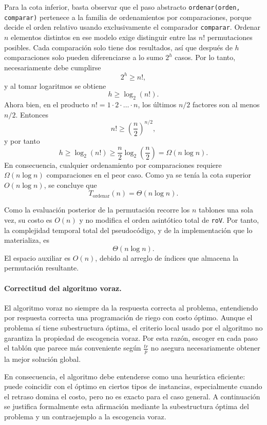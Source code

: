 \documentclass[12pt,a4paper]{article}
\begin{document}
Para la cota inferior, basta observar que el paso abstracto \texttt{ordenar(orden, comparar)} pertenece a la familia de ordenamientos por comparaciones, porque decide el orden relativo usando exclusivamente el comparador \texttt{comparar}. Ordenar \(n\) elementos distintos en ese modelo exige distinguir entre las \(n!\) permutaciones posibles. Cada comparaci\'on solo tiene dos resultados, as\'i que despu\'es de \(h\) comparaciones solo pueden diferenciarse a lo sumo \(2^h\) casos. Por lo tanto, necesariamente debe cumplirse
\[
2^h \ge n!,
\]
y al tomar logaritmos se obtiene
\[
h \ge \log_2(n!).
\]
Ahora bien, en el producto \(n!=1\cdot 2\cdot \dots \cdot n\), los \'ultimos \(n/2\) factores son al menos \(n/2\). Entonces
\[
n! \ge \left(\frac{n}{2}\right)^{n/2},
\]
y por tanto
\[
h \ge \log_2(n!) \ge \frac{n}{2}\log_2\!\left(\frac{n}{2}\right)=\Omega(n\log n).
\]
En consecuencia, cualquier ordenamiento por comparaciones requiere \(\Omega(n\log n)\) comparaciones en el peor caso. Como ya se ten\'ia la cota superior \(O(n\log n)\), se concluye que
\[
T_{\text{ordenar}}(n)=\Theta(n\log n).
\]

Como la evaluaci\'on posterior de la permutaci\'on recorre los \(n\) tablones una sola vez, su costo es \(O(n)\) y no modifica el orden asint\'otico total de \texttt{roV}. Por tanto, la complejidad temporal total del pseudoc\'odigo, y de la implementaci\'on que lo materializa, es
\[
\Theta(n\log n).
\]
El espacio auxiliar es \(O(n)\), debido al arreglo de \'indices que almacena la permutaci\'on resultante.

\paragraph{Correctitud del algoritmo voraz.}
El algoritmo voraz no siempre da la respuesta correcta al problema, entendiendo por respuesta correcta una programaci\'on de riego con costo \'optimo. Aunque el problema s\'i tiene subestructura \'optima, el criterio local usado por el algoritmo no garantiza la propiedad de escogencia voraz. Por esta raz\'on, escoger en cada paso el tabl\'on que parece m\'as conveniente seg\'un \(\frac{tr}{p}\) no asegura necesariamente obtener la mejor soluci\'on global.

En consecuencia, el algoritmo debe entenderse como una heur\'istica eficiente: puede coincidir con el \'optimo en ciertos tipos de instancias, especialmente cuando el retraso domina el costo, pero no es exacto para el caso general. A continuaci\'on se justifica formalmente esta afirmaci\'on mediante la subestructura \'optima del problema y un contraejemplo a la escogencia voraz.
\end{document}
